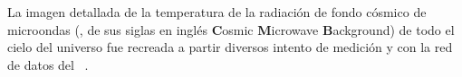 



La imagen detallada de la temperatura de la radiación de fondo cósmico de microondas (\CMB, de sus siglas en inglés \textbf{C}osmic \textbf{M}icrowave \textbf{B}ackground) de todo el cielo del universo fue recreada a partir diversos intento de medición y con la red de datos del~\WMAP %
.

